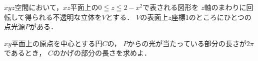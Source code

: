 \documentclass[../../main.tex]{subfiles}
\begin{document}
$xyz$空間において，$xz$平面上の$0 \leqq z \leqq 2-x^2$で表される図形を
$z$軸のまわりに回転して得られる不透明な立体を$V$とする．
$V$の表面上$z$座標1のところにひとつの点光源$P$がある．

$xy$平面上の原点を中心とする円$C$の，
$P$からの光が当たっている部分の長さが$2\pi$であるとき，
$C$のかげの部分の長さを求めよ．
\end{document}
